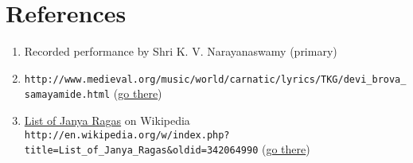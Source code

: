 \documentclass[12pt]{article}
\begin{document}
 
\section*{References}
\begin{enumerate}
\item Recorded performance by Shri K. V. Narayanaswamy (primary)
\item {\scriptsize \verb|http://www.medieval.org/music/world/carnatic/lyrics/TKG/devi_brova_samayamide.html| (\href{http://www.medieval.org/music/world/carnatic/lyrics/TKG/devi_brova_samayamide.html}{go there})}
\item \href{http://en.wikipedia.org/wiki/List_of_Janya_Ragas}{List of Janya Ragas} on Wikipedia\\
{\scriptsize \verb|http://en.wikipedia.org/w/index.php?title=List_of_Janya_Ragas&oldid=342064990|  (\href{http://en.wikipedia.org/w/index.php?title=List_of_Janya_Ragas&oldid=342064990}{go there})}
\end{enumerate}
\end{document}
